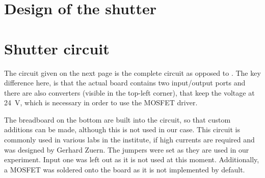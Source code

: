 \chapter{Design of the shutter}
\label{ch:shutter_design}

\chapter{Shutter circuit}
\label{ch:shutter_circuit}
The circuit given on the next page is the complete circuit as opposed to . The key difference here, is that the actual board contains two input/output ports and there are also converters (visible in the top-left corner), that keep the voltage at \SI{24}{\volt}, which is necessary in order to use the MOSFET driver.

The breadboard on the bottom are built into the circuit, so that custom additions can be made, although this is not used in our case. This circuit is commonly used in various labs in the institute, if high currents are required and was designed by Gerhard Zuern. The jumpers were set as they are used in our experiment. Input one was left out as it is not used at this moment. Additionally, a MOSFET was soldered onto the board as it is not implemented by default.

